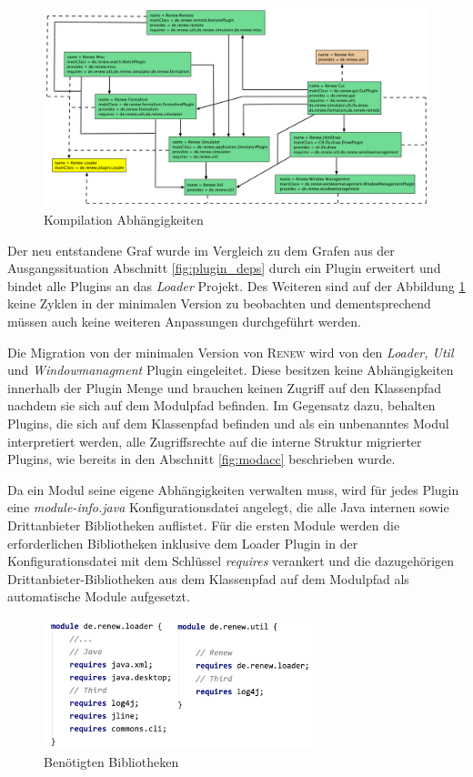 	\begin{figure}[h!]
	  \centering
	  \includegraphics[width=\textwidth]{material/images/renew_plugin_dependencies-module-info.pdf}
	  \caption{Kompilation Abhängigkeiten}
	  \label{fig:deps}
	\end{figure}

	Der neu entstandene Graf wurde im Vergleich zu dem Grafen aus der Ausgangssituation Abschnitt \ref{fig:plugin_deps} durch ein Plugin erweitert und bindet alle Plugins an das \textit{Loader} Projekt. Des Weiteren sind auf der Abbildung \ref{fig:deps} keine Zyklen in der minimalen Version zu beobachten und dementsprechend müssen auch keine weiteren Anpassungen durchgeführt werden. \bigbreak

	Die Migration von der minimalen Version von \textsc{Renew} wird von den \textit{Loader, Util} und \textit{Windowmanagment} Plugin eingeleitet. Diese besitzen keine Abhängigkeiten innerhalb der Plugin Menge und brauchen keinen Zugriff auf den Klassenpfad nachdem sie sich auf dem Modulpfad befinden. Im Gegensatz dazu, behalten Plugins, die sich auf dem Klassenpfad befinden und als ein unbenanntes Modul interpretiert werden, alle Zugriffsrechte auf die interne Struktur migrierter Plugins, wie bereits in den Abschnitt \ref{fig:modacc} beschrieben wurde.\bigbreak

	Da ein Modul seine eigene Abhängigkeiten verwalten muss, wird für jedes Plugin eine \textit{module-info.java} Konfigurationsdatei angelegt, die alle Java internen sowie Drittanbieter Bibliotheken auflistet. Für die ersten Module werden die erforderlichen Bibliotheken inklusive dem Loader Plugin in der Konfigurationsdatei mit dem Schlüssel \textit{requires} verankert und die dazugehörigen Drittanbieter-Bibliotheken aus dem Klassenpfad auf dem Modulpfad als automatische Module aufgesetzt.

	\begin{figure}[h!]
	  \centering
	  \includegraphics[width=0.7\textwidth]{material/images/loaderUtil-info.png}
	  \caption{Benötigten Bibliotheken}
	  \label{fig:loaderUtil}
	\end{figure}

